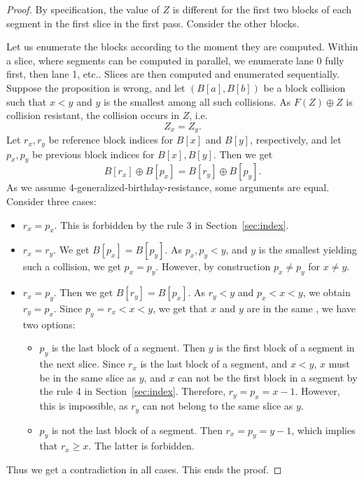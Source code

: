 \documentclass[a4paper]{article}
\begin{document}
\begin{proof}
    By specification, the value of $Z$ is different for the first two blocks of each segment in the first slice in the first pass. Consider the other blocks.

  Let us enumerate the blocks according to the moment they are computed. Within a slice, where segments can be computed in parallel, we enumerate lane 0 fully first, then lane 1, etc.. Slices are then computed and enumerated sequentially.
  Suppose the proposition is wrong, and  let $(B[a],B[b])$ be a block collision such that $x<y$ and $y$ is the smallest among all such collisions. As $F(Z)\oplus Z$ is collision resistant,
  the collision occurs in $Z$, i.e.
  $$
  Z_x = Z_y.
  $$
  Let $r_x, r_y$ be reference block indices for $B[x]$ and $B[y]$, respectively, and let $p_x, p_y$ be previous block indices for $B[x],B[y].$ Then we get
  $$
  B[r_x] \oplus B[p_x] = B[r_y] \oplus B[p_y].
  $$
  As we assume 4-generalized-birthday-resistance, some arguments are equal. Consider three cases:
  \begin{itemize}
    \item $r_x=p_x$. This is forbidden by the rule 3 in Section~\ref{sec:index}.
    \item $r_x=r_y$.  We get $B[p_x] =  B[p_y]$. As $p_x,p_y <y$, and $y$ is the smallest yielding such a collision, we get $p_x = p_y$. However, by construction $p_x \neq p_y$ for $x\neq y$.
    \item $r_x = p_y$. Then we get $B[r_y] = B[p_x]$. As $r_y <y$ and $p_x<x<y$, we obtain $r_y = p_x$. Since $p_y=r_x<x<y$, we get that $x$ and $y$ are in the same , we have two options:
    \begin{itemize}
    \item $p_y$ is the last block of a segment. Then $y$ is the first block of a segment in the next slice. Since $r_x$ is the last block of a segment, and $x<y$, $x$ must be in the   same slice as $y$, and $x$ can not be the first block in a segment by the rule 4 in Section~\ref{sec:index}. Therefore, $r_y=p_x = x-1$. However, this is impossible, as $r_y$ can not belong to the same slice as $y$.
        \item $p_y$ is not the last block of a segment. Then $r_x = p_y = y-1$, which implies that $r_x \geq x$. The latter is forbidden.
    \end{itemize}
  \end{itemize}
  Thus we get a contradiction in all cases. This ends the proof.
\end{proof}
\end{document}
